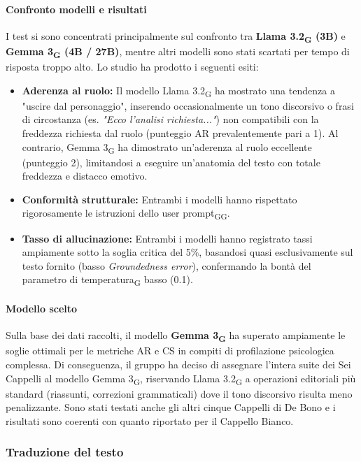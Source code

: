 \documentclass[11pt,a4paper]{article}
\newcommand{\gls}[1]{#1\textsubscript{G}}
\begin{document}
\paragraph{Confronto modelli e risultati}
I test si sono concentrati principalmente sul confronto tra \textbf{\gls{Llama 3.2} (3B)} e \textbf{\gls{Gemma 3} (4B / 27B)}, mentre altri modelli sono stati scartati per tempo di risposta troppo alto. Lo studio ha prodotto i seguenti esiti:
\begin{itemize}
    \item \textbf{Aderenza al ruolo:} Il modello \gls{Llama 3.2} ha mostrato una tendenza a "uscire dal personaggio", inserendo occasionalmente un tono discorsivo o frasi di circostanza (es. \textit{"Ecco l'analisi richiesta..."}) non compatibili con la freddezza richiesta dal ruolo (punteggio AR prevalentemente pari a 1). Al contrario, \gls{Gemma 3} ha dimostrato un'aderenza al ruolo eccellente (punteggio 2), limitandosi a eseguire un'anatomia del testo con totale freddezza e distacco emotivo.
    
    \item \textbf{Conformità strutturale:} Entrambi i modelli hanno rispettato rigorosamente le istruzioni dello \gls{user \gls{prompt}}.
    
    \item \textbf{Tasso di allucinazione:} Entrambi i modelli hanno registrato tassi ampiamente sotto la soglia critica del 5\%, basandosi quasi esclusivamente sul testo fornito (basso \textit{Groundedness error}), confermando la bontà del parametro di \gls{temperatura} basso (0.1).
\end{itemize}

\paragraph{Modello scelto}
Sulla base dei dati raccolti, il modello \textbf{\gls{Gemma 3}} ha superato ampiamente le soglie ottimali per le metriche AR e CS in compiti di profilazione psicologica complessa. Di conseguenza, il gruppo ha deciso di assegnare l'intera suite dei Sei Cappelli al modello \gls{Gemma 3}, riservando \gls{Llama 3.2} a operazioni editoriali più standard (riassunti, correzioni grammaticali) dove il tono discorsivo risulta meno penalizzante. Sono stati testati anche gli altri cinque Cappelli di De Bono e i risultati sono coerenti con quanto riportato per il Cappello Bianco.

\subsubsection{Traduzione del testo}
\end{document}
